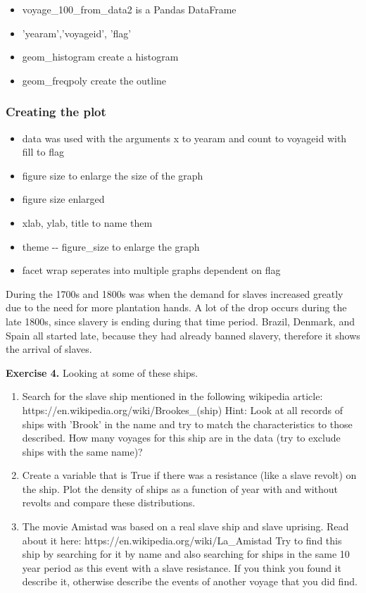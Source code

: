 \documentclass[11pt]{article}
\providecommand{\tightlist}{%
      \setlength{\itemsep}{0pt}\setlength{\parskip}{0pt}}
\begin{document}
\begin{itemize}
\tightlist
\item
  voyage\_100\_from\_data2 is a Pandas DataFrame
\item
  'yearam','voyageid', 'flag'
\item
  geom\_histogram create a histogram
\item
  geom\_freqpoly create the outline
\end{itemize}

\subsubsection{Creating the plot}\label{creating-the-plot}

\begin{itemize}
\tightlist
\item
  data was used with the arguments x to yearam and count to voyageid
  with fill to flag
\item
  figure size to enlarge the size of the graph
\item
  figure size enlarged
\item
  xlab, ylab, title to name them
\item
  theme -\/- figure\_size to enlarge the graph
\item
  facet wrap seperates into multiple graphs dependent on flag
\end{itemize}

    During the 1700s and 1800s was when the demand for slaves increased
greatly due to the need for more plantation hands. A lot of the drop
occurs during the late 1800s, since slavery is ending during that time
period. Brazil, Denmark, and Spain all started late, because they had
already banned slavery, therefore it shows the arrival of slaves.

    \textbf{Exercise 4.} Looking at some of these ships.

\begin{enumerate}
\def\labelenumi{\arabic{enumi}.}
\tightlist
\item
  Search for the slave ship mentioned in the following wikipedia
  article: https://en.wikipedia.org/wiki/Brookes\_(ship) Hint: Look at
  all records of ships with 'Brook' in the name and try to match the
  characteristics to those described. How many voyages for this ship are
  in the data (try to exclude ships with the same name)?
\item
  Create a variable that is True if there was a resistance (like a slave
  revolt) on the ship. Plot the density of ships as a function of year
  with and without revolts and compare these distributions.
\item
  The movie Amistad was based on a real slave ship and slave uprising.
  Read about it here: https://en.wikipedia.org/wiki/La\_Amistad Try to
  find this ship by searching for it by name and also searching for
  ships in the same 10 year period as this event with a slave
  resistance. If you think you found it describe it, otherwise describe
  the events of another voyage that you did find.
\end{enumerate}
\end{document}
